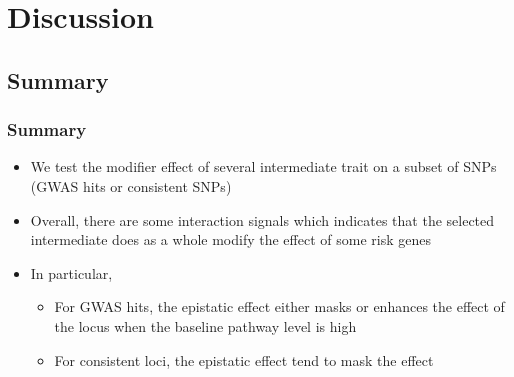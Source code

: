 \documentclass{beamer}
\begin{document}
\section{Discussion}

  \subsection{Summary}
  \begin{frame}
  \frametitle{Summary}
    \begin{itemize}
      \item We test the modifier effect of several intermediate trait on a subset of SNPs (GWAS hits or consistent SNPs)
      \item Overall, there are some interaction signals which indicates that the selected intermediate does as a whole modify the effect of some risk genes
      \item In particular,
        \begin{itemize}
          \item For GWAS hits, the epistatic effect either masks or enhances the effect of the locus when the baseline pathway level is high
          \item For consistent loci, the epistatic effect tend to mask the effect
        \end{itemize}
    \end{itemize}
  \end{frame}
\end{document}
